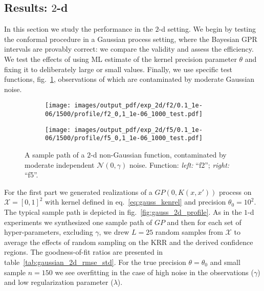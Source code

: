 \documentclass[a4paper,14pt]{extarticle}
\newcommand{\Ncal}{\mathcal{N}}
\newcommand{\Xcal}{\mathcal{X}}
\begin{document}

\subsection{Results: $2$-d} %
\label{sub:results_2_d}

In this section we study the performance in the $2$-d setting. We begin by testing
the conformal procedure in a Gaussian process setting, where the Bayesian GPR intervals
are provably correct: we compare the validity and assess the efficiency. We test
the effects of using ML estimate of the kernel precision parameter $\theta$ and
fixing it to deliberately large or small values. Finally, we use specific test functions,
fig.~\ref{fig:nongauss_2d_profile}, observations of which are contaminated by moderate
Gaussian noise.

\begin{figure}%
  \centering
  \begin{subfigure}[b]{0.5\linewidth}
    \texttt{[image: images/output\_pdf/exp\_2d/f2/0.1\_1e-06/1500/profile/f2\_0,1\_1e-06\_1000\_test.pdf]}
  \end{subfigure}%
  \begin{subfigure}[b]{0.5\linewidth}
    \texttt{[image: images/output\_pdf/exp\_2d/f5/0.1\_1e-06/1500/profile/f5\_0,1\_1e-06\_1000\_test.pdf]}
  \end{subfigure}
  \caption{A sample path of a $2$-d non-Gaussian function, contaminated by moderate
  independent $\Ncal(0, \gamma)$ noise. Function: \textit{left:} ``f2''; \textit{right:}
  ``f5''.}
  \label{fig:nongauss_2d_profile}
\end{figure}

For the first part we generated realizations of a $GP(0, K(x,x'))$ process on $\Xcal=[0,1]^2$
with kernel defined in eq.~\ref{eq:gauss_kenrel} and precision $\theta_0 = 10^2$.
The typical sample path is depicted in fig.~\ref{fig:gauss_2d_profile}. As in the
$1$-d experiments we synthesized one sample path of $GP$ and then for each set of
hyper-parameters, excluding $\gamma$, we drew $L=25$ random samples from $\Xcal$
to average the effects of random sampling on the KRR and the derived confidence regions.
The goodness-of-fit ratios are presented in table~\ref{tab:gaussian_2d_rmse_std}.
For the true precision $\theta=\theta_0$ and small sample $n=150$ we see overfitting
in the case of high noise in the observations ($\gamma$) and low regularization
parameter ($\lambda$).
\end{document}

